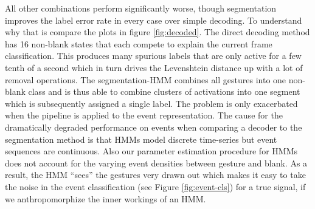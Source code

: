 All other combinations perform significantly worse, though segmentation improves
the label error rate in every case over simple decoding. To understand why that
is compare the plots in figure \ref{fig:decoded}. The direct decoding method has
16 non-blank states that each compete to explain the current frame
classification. This produces many spurious labels that are only active for a
few tenth of a second which in turn drives the Levenshtein distance up with a
lot of removal operations. The segmentation-HMM combines all gestures into one
non-blank class and is thus able to combine clusters of activations into one
segment which is subsequently assigned a single label. The problem is only
exacerbated when the pipeline is applied to the event representation. The cause
for the dramatically degraded performance on events when comparing a decoder to
the segmentation method is that HMMs model discrete time-series but event
sequences are continuous. Also our parameter estimation procedure for HMMs does
not account for the varying event densities between gesture and blank. As a
result, the HMM ``sees'' the gestures very drawn out which makes it easy to take
the noise in the event classification (see Figure \ref{fig:event-cls}) for a
true signal, if we anthropomorphize the inner workings of an HMM.

